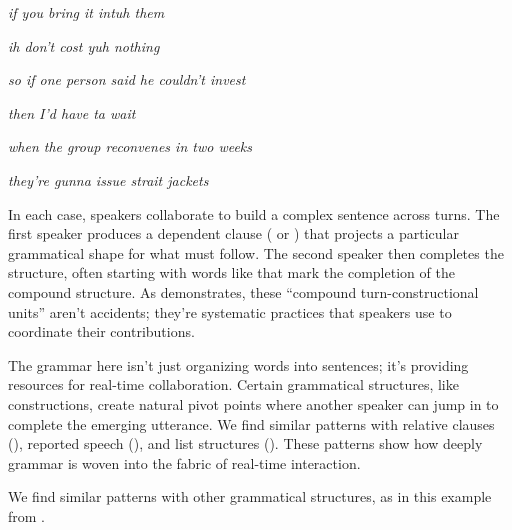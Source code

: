 \ea
  \ea
  \begin{dialogue}
      \item[Rich] \emph{if you bring it intuh them}
      \item[Carol] \emph{ih don't cost yuh nothing}
  \end{dialogue}
  \ex
  \begin{dialogue}
      \item[David] \emph{so if one person said he couldn't invest}
      \item[Kerry] \emph{then I'd have ta wait}
  \end{dialogue}
  \ex
  \begin{dialogue}
      \item[Dan] \emph{when the group reconvenes in two weeks}
      \item[Roger] \emph{they're gunna issue strait jackets}
  \end{dialogue}
  \z
\z
In each case, speakers collaborate to build a complex sentence across turns. The first speaker produces a dependent clause ( or ) that projects a particular grammatical shape for what must follow. The second speaker then completes the structure, often starting with words like  that mark the completion of the compound structure. As \citet{lerner1991} demonstrates, these \enquote{compound turn-constructional units} aren't accidents; they're systematic practices that speakers use to coordinate their contributions.

The grammar here isn't just organizing words into sentences; it's providing resources for real-time collaboration. Certain grammatical structures, like  constructions, create natural pivot points where another speaker can jump in to complete the emerging utterance. We find similar patterns with relative clauses (), reported speech (), and list structures (). These patterns show how deeply grammar is woven into the fabric of real-time interaction.

We find similar patterns with other grammatical structures, as in this example from \citet{szczepek2000}.

